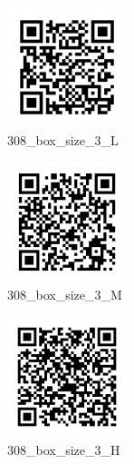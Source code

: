 \documentclass[a4]{article}
\begin{document}
	 
	
	\begin{figure}
		\centering
		\includegraphics[width = 3.5cm,height = 3.5cm]{Size3_L}
		\caption*{\large{308\_box\_size\_3\_L}}
		\label{fig:null_data_frame_psdos}
	\end{figure}
	 

\begin{figure}
	\centering
	\includegraphics[width = 3.5cm,height = 3.5cm]{Size3_M}
	\caption*{\large{308\_box\_size\_3\_M}}
	\label{fig:null_data_frame_psdos}
\end{figure}
 

		  
	
	\begin{figure}
		\centering
		\includegraphics[width = 3.5cm,height = 3.5cm]{Size3_H}
		\caption*{\large{308\_box\_size\_3\_H}}
		\label{fig:null_data_frame_psdos}
	\end{figure}
	
	\cleardoublepage
	
	
	\newpage
\end{document}
